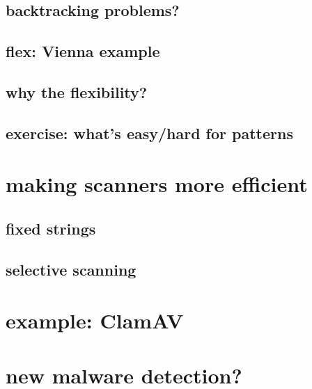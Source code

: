 

\subsection{backtracking problems?}




\subsection{flex: Vienna example}


\subsection{why the flexibility?}

\subsection{exercise: what's easy/hard for patterns}


\section{making scanners more efficient}


\subsection{fixed strings}


\subsection{selective scanning}


\section{example: ClamAV}


\section{new malware detection?}


